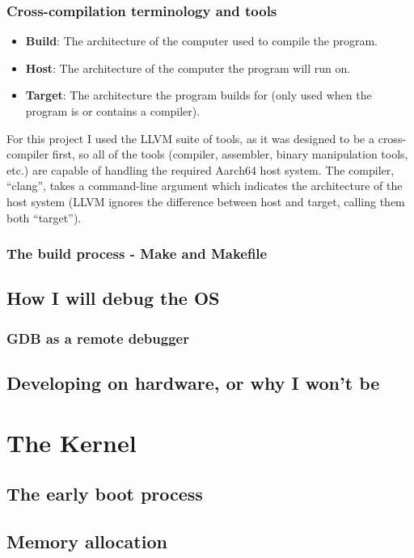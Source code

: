 \documentclass{article}
\begin{document}
\subsubsection{Cross-compilation terminology and tools}
\begin{itemize}
    \item \textbf{Build}: The architecture of the computer used to compile the
        program.
    \item \textbf{Host}: The architecture of the computer the program will run
        on.
    \item \textbf{Target}: The architecture the program builds for (only used
        when the program is or contains a compiler).
\end{itemize}
For this project I used the LLVM suite of tools, as it was designed to be a
cross-compiler first, so all of the tools (compiler, assembler, binary
manipulation tools, etc.) are capable of handling the required Aarch64 host
system. The compiler, ``clang'', takes a command-line argument which indicates
the architecture of the host system (LLVM ignores the difference between host
and target, calling them both ``target'').
\subsubsection{The build process - Make and Makefile}
\subsection{How I will debug the OS}
\subsubsection{GDB as a remote debugger}
\subsection{Developing on hardware, or why I won't be}

\clearpage
\section{The Kernel}
\subsection{The early boot process}
\subsection{Memory allocation}
\end{document}
